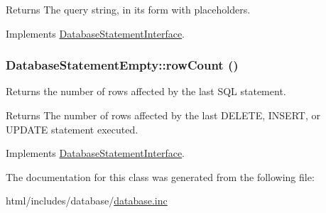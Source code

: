 \begin{DoxyReturn}{Returns}
The query string, in its form with placeholders. 
\end{DoxyReturn}


Implements \hyperlink{interfaceDatabaseStatementInterface_a2c248a565c623713d8e5ddf0ba83880d}{DatabaseStatementInterface}.\hypertarget{classDatabaseStatementEmpty_aba97790d259fd594defbd52ff9f1037d}{
\subsubsection[{rowCount}]{\setlength{\rightskip}{0pt plus 5cm}DatabaseStatementEmpty::rowCount ()}}
\label{classDatabaseStatementEmpty_aba97790d259fd594defbd52ff9f1037d}
Returns the number of rows affected by the last SQL statement.

\begin{DoxyReturn}{Returns}
The number of rows affected by the last DELETE, INSERT, or UPDATE statement executed. 
\end{DoxyReturn}


Implements \hyperlink{interfaceDatabaseStatementInterface_a97657e1cf89c6e1700f7bfa0e90deaf5}{DatabaseStatementInterface}.

The documentation for this class was generated from the following file:\begin{DoxyCompactItemize}
\item 
html/includes/database/\hyperlink{database_8inc}{database.inc}\end{DoxyCompactItemize}
